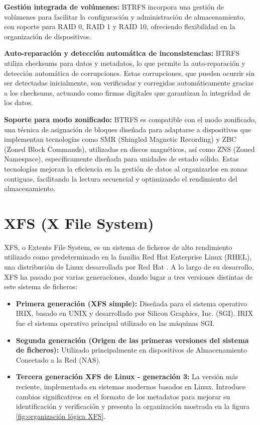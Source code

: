 \textbf{Gestión integrada de volúmenes:} BTRFS incorpora una gestión de volúmenes para facilitar la configuración y administración de almacenamiento, con soporte para RAID 0, RAID 1 y RAID 10, ofreciendo flexibilidad en la organización de dispositivos.\newline

\textbf{Auto-reparación y detección automática de inconsistencias:} BTRFS utiliza checksums para datos y metadatos, lo que permite la auto-reparación y detección automática de corrupciones. Estas corrupciones, que pueden ocurrir sin ser detectadas inicialmente, son verificadas y corregidas automáticamente gracias a los checksums, actuando como firmas digitales que garantizan la integridad de los datos.\newline

\textbf{Soporte para modo zonificado:} BTRFS es compatible con el modo zonificado, una técnica de asignación de bloques diseñada para adaptarse a dispositivos que implementan tecnologías como SMR (Shingled Magnetic Recording) y ZBC (Zoned Block Commands), utilizadas en discos magnéticos, así como ZNS (Zoned Namespace), específicamente diseñada para unidades de estado sólido. Estas tecnologías mejoran la eficiencia en la gestión de datos al organizarlos en zonas contiguas, facilitando la lectura secuencial y optimizando el rendimiento del almacenamiento.\cite{ZBC,ZNS}

\section{XFS (X File System)}

XFS, o Extents File System, es un sistema de ficheros de alto rendimiento utilizado como predeterminado en la familia Red Hat Enterprise Linux (RHEL), una distribución de Linux desarrollada por Red Hat \cite{xfs-wiki,weil2006ceph,sweeney1996scalability,beck1997xfs,soltis2007xfs}. A lo largo de su desarrollo, XFS ha pasado por varias generaciones, dando lugar a tres versiones distintas de este sistema de ficheros:

\begin{itemize}
    \item \textbf{Primera generación (XFS simple):} Diseñada para el sistema operativo IRIX, basado en UNIX y desarrollado por Silicon Graphics, Inc. (SGI). IRIX fue el sistema operativo principal utilizado en las máquinas SGI.
    
    \item \textbf{Segunda generación (Origen de las primeras versiones del sistema de ficheros):} Utilizado principalmente en dispositivos de Almacenamiento Conectado a la Red (NAS).

    \item \textbf{Tercera generación XFS de Linux - generación 3:} La versión más reciente, implementada en sistemas modernos basados en Linux. Introduce cambios significativos en el formato de los metadatos para mejorar su identificación y verificación y presenta la organización mostrada en la figura \ref{fig:organización lógica XFS}.
\end{itemize}

